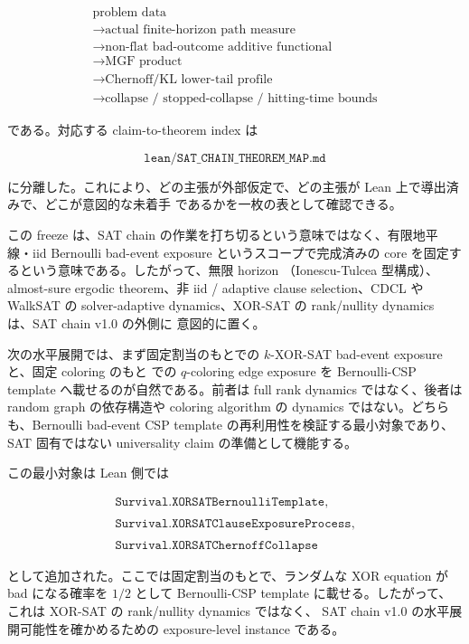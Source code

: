 \documentclass[12pt,a4paper]{article}
\begin{document}
\[
\begin{aligned}
\text{problem data} \\
\to \text{actual finite-horizon path measure} \\
\to \text{non-flat bad-outcome additive functional} \\
\to \text{MGF product} \\
\to \text{Chernoff/KL lower-tail profile} \\
\to \text{collapse / stopped-collapse / hitting-time bounds}
\end{aligned}
\]

である。対応する claim-to-theorem index は

\[
\texttt{lean/SAT\_CHAIN\_THEOREM\_MAP.md}
\]

に分離した。これにより、どの主張が外部仮定で、どの主張が Lean 上で導出済みで、どこが意図的な未着手 であるかを一枚の表として確認できる。

この freeze は、SAT chain の作業を打ち切るという意味ではなく、有限地平線・iid Bernoulli bad-event exposure というスコープで完成済みの core を固定するという意味である。したがって、無限 horizon （Ionescu-Tulcea 型構成）、almost-sure ergodic theorem、非 iid / adaptive clause selection、CDCL や WalkSAT の solver-adaptive dynamics、XOR-SAT の rank/nullity dynamics は、SAT chain v1.0 の外側に 意図的に置く。

次の水平展開では、まず固定割当のもとでの \(k\)-XOR-SAT bad-event exposure と、固定 coloring のもと での \(q\)-coloring edge exposure を Bernoulli-CSP template へ載せるのが自然である。前者は full rank dynamics ではなく、後者は random graph の依存構造や coloring algorithm の dynamics ではない。どちら も、Bernoulli bad-event CSP template の再利用性を検証する最小対象であり、SAT 固有ではない universality claim の準備として機能する。

この最小対象は Lean 側では

\[
\begin{aligned}
\texttt{Survival.XORSATBernoulliTemplate}, \\
\qquad \\
\texttt{Survival.XORSATClauseExposureProcess}, \\
\qquad \\
\texttt{Survival.XORSATChernoffCollapse}
\end{aligned}
\]

として追加された。ここでは固定割当のもとで、ランダムな XOR equation が bad になる確率を \(1/2\) として Bernoulli-CSP template に載せる。したがって、これは XOR-SAT の rank/nullity dynamics ではなく、 SAT chain v1.0 の水平展開可能性を確かめるための exposure-level instance である。
\end{document}
